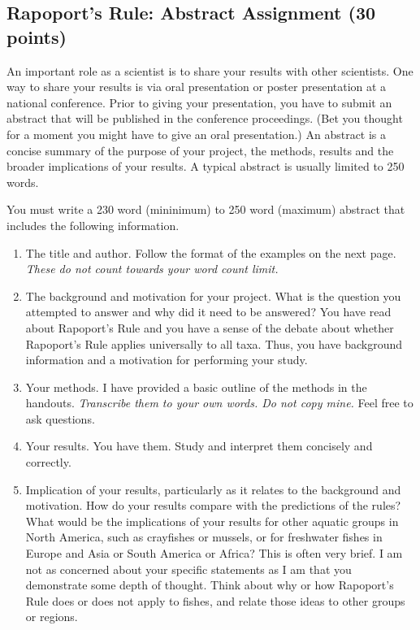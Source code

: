 \documentclass[11pt]{article}
\begin{document}
\thispagestyle{first_page}

\subsection*{Rapoport's Rule: Abstract Assignment (30 points)}

An important role as a scientist is to share your results with other
scientists. One way to share your results is via oral presentation or
poster presentation at a national conference. Prior to giving your
presentation, you have to submit an abstract that will be published in
the conference proceedings. (Bet you thought for a moment you might have
to give an oral presentation.) An abstract is a concise summary of the
purpose of your project, the methods, results and the broader
implications of your results. A typical abstract is usually limited to
250 words.

You must write a 230 word (mininimum) to 250 word (maximum) abstract 
that includes the following information.

\begin{enumerate}
	\item The title and author. Follow the format of the examples on the next page.
	\textit{These do not count towards your word count limit.}

	\item The background and motivation for your project. What
	is the question you attempted to answer and why did it need to be
	answered? You have read about Rapoport's Rule and you have a sense of
	the debate about whether Rapoport's Rule applies universally to all
	taxa. Thus, you have background information and a motivation for
	performing your study.

	\item Your methods. I have provided a basic outline of the methods
	in the handouts. \textit{Transcribe them to your own words. Do not copy mine.} Feel free to ask questions.

	\item Your results. You have them. Study and interpret them
	concisely and correctly.

	\item Implication of your results, particularly as it relates to
	the background and motivation. How do your results compare with the
	predictions of the rules? What would be the implications of your results
	for other aquatic groups in North America, such as crayfishes or
	mussels, or for freshwater fishes in Europe and Asia or South America or
	Africa? This is often very brief. I am not as concerned about your
	specific statements as I am that you demonstrate some depth of thought.
	Think about why or how Rapoport's Rule does or does not apply to fishes,
	and relate those ideas to other groups or regions.

\end{enumerate}
\end{document}
